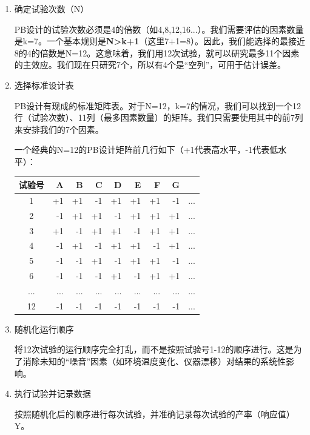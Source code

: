 \documentclass[fontset=windows,12pt]{ctexart}
\begin{document}
\begin{enumerate}
	\item 确定试验次数（N）
	
	PB设计的试验次数必须是4的倍数（如4,8,12,16...）。我们需要评估的因素数量是k=7。一个基本规则是\textbf{N>k+1}（这里7+1=8）。因此，我们能选择的最接近8的4的倍数是N=12。这意味着，我们用12次试验，就可以研究最多11个因素的主效应。我们现在只研究7个，所以有4个是“空列”，可用于估计误差。
	
	\item 选择标准设计表
	
	PB设计有现成的标准矩阵表。对于N=12，k=7的情况，我们可以找到一个12行（试验次数）、11列（最多因素数量）的矩阵。我们只需要使用其中的前7列来安排我们的7个因素。
	
	一个经典的N=12的PB设计矩阵前几行如下（+1代表高水平，-1代表低水平）：

	\begin{table}[H]
		\centering
		\begin{tabular}{crrrrrrrr}
			\toprule
			{\textbf{试验号}} & {\textbf{A}} & {\textbf{B}} & {\textbf{C}} & \textbf{D} & \textbf{E} & \textbf{F} & \textbf{G} & {} \\
			\midrule
			1 & +1 & +1 & -1 & +1 & +1 & +1 & -1 & ... \\
			2 & -1 & +1 & +1 & -1 & +1 & +1 & +1 & ... \\
			3 & +1 & -1 & +1 & +1 & -1 & +1 & +1 & ... \\
			4 & -1 & +1 & -1 & +1 & +1 & -1 & +1 & ... \\
			5 & -1 & -1 & +1 & -1 & +1 & +1 & -1 & ... \\
			6 & -1 & -1 & -1 & +1 & -1 & +1 & +1 & ... \\
			... & ... & ... & ... & ... & ... & ... & ... & ... \\
			12 & -1 & -1 & -1 & -1 & -1 & -1 & -1 & ... \\
			\bottomrule
		\end{tabular}
	\end{table}

	\item 随机化运行顺序

	将12次试验的运行顺序完全打乱，而不是按照试验号1-12的顺序进行。这是为了消除未知的“噪音”因素（如环境温度变化、仪器漂移）对结果的系统性影响。

	\item 执行试验并记录数据

	按照随机化后的顺序进行每次试验，并准确记录每次试验的产率（响应值）Y。

\end{enumerate}
\end{document}

